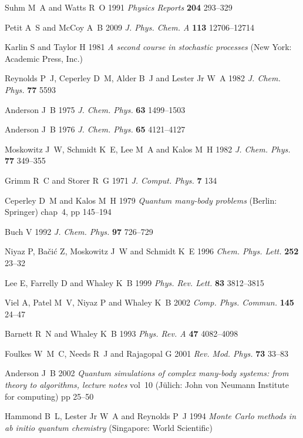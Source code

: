 \documentclass[12pt]{iopart}
\begin{document}
\begin{thebibliography}{100}
Suhm M~A and Watts R~O 1991 {\em Physics Reports\/} {\bf 204} 293--329

Petit A~S and McCoy A~B 2009 {\em J. Phys. Chem. A\/} {\bf 113} 12706--12714

Karlin S and Taylor H 1981 {\em A second course in stochastic processes\/} (New
  York: Academic Press, Inc.)

Reynolds P~J, Ceperley D~M, Alder B~J and {Lester Jr} W~A 1982 {\em J. Chem.
  Phys.\/} {\bf 77} 5593

Anderson J~B 1975 {\em J. Chem. Phys.\/} {\bf 63} 1499--1503

Anderson J~B 1976 {\em J. Chem. Phys.\/} {\bf 65} 4121--4127

Moskowitz J~W, Schmidt K~E, Lee M~A and Kalos M~H 1982 {\em J. Chem. Phys.\/}
  {\bf 77} 349--355

Grimm R~C and Storer R~G 1971 {\em J. Comput. Phys.\/} {\bf 7} 134

Ceperley D~M and Kalos M~H 1979 {\em Quantum many-body problems\/} (Berlin:
  Springer) chap~4, pp 145--194

Buch V 1992 {\em J. Chem. Phys.\/} {\bf 97} 726--729

Niyaz P, Ba{\v c}i{\'c} Z, Moskowitz J~W and Schmidt K~E 1996 {\em Chem. Phys.
  Lett.\/} {\bf 252} 23--32

Lee E, Farrelly D and Whaley K~B 1999 {\em Phys. Rev. Lett.\/} {\bf 83}
  3812--3815

Viel A, Patel M~V, Niyaz P and Whaley K~B 2002 {\em Comp. Phys. Commun.\/} {\bf
  145} 24--47

Barnett R~N and Whaley K~B 1993 {\em Phys. Rev. A\/} {\bf 47} 4082--4098

Foulkes W~M~C, Needs R~J and Rajagopal G 2001 {\em Rev. Mod. Phys.\/} {\bf 73}
  33--83

Anderson J~B 2002 {\em Quantum simulations of complex many-body systems: from
  theory to algorithms, lecture notes\/} vol~10 (J{\"u}lich: John von Neumann
  Institute for computing) pp 25--50

Hammond B~L, {Lester Jr} W~A and Reynolds P~J 1994 {\em Monte Carlo methods in
  ab initio quantum chemistry\/} (Singapore: World Scientific)


\end{thebibliography}
\end{document}
